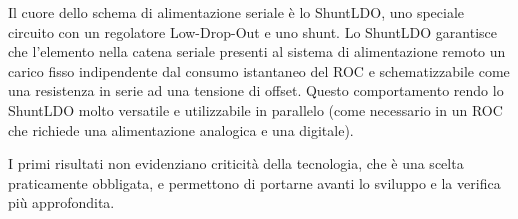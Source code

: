 
Il cuore dello schema di alimentazione seriale \`e lo ShuntLDO, uno speciale circuito con un regolatore Low-Drop-Out e uno shunt. Lo ShuntLDO garantisce che l'elemento nella catena seriale presenti al sistema di alimentazione remoto un carico fisso indipendente dal consumo istantaneo del ROC e schematizzabile come una resistenza in serie ad una tensione di offset. Questo comportamento rendo lo ShuntLDO molto versatile e utilizzabile in parallelo (come necessario in un ROC che richiede una alimentazione analogica e una digitale).




I primi risultati non evidenziano criticit\`a della tecnologia, che \`e una scelta praticamente obbligata, e permettono di portarne avanti lo sviluppo e la verifica pi\`u approfondita.

